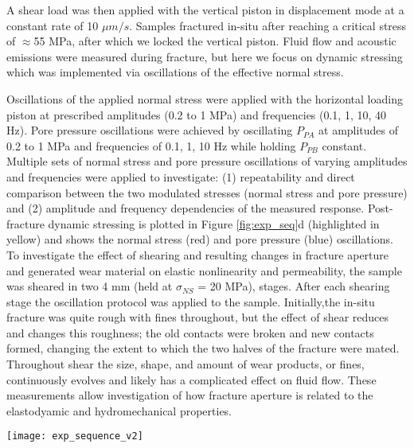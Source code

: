 \documentclass[draft]{agujournal2019}
\begin{document}
A shear load was then applied with the vertical piston in displacement mode at a constant rate of 10 $\mu m/s$. Samples fractured in-situ after reaching a critical stress of $ \approx $55 MPa, after which we locked the vertical piston. Fluid flow and acoustic emissions were measured during fracture, but here we focus on dynamic stressing which was implemented via oscillations of the effective normal stress.

Oscillations of the applied normal stress were applied with the horizontal loading piston at prescribed amplitudes (0.2 to 1 MPa) and frequencies (0.1, 1, 10, 40 Hz). Pore pressure oscillations were achieved by oscillating $P_{PA}$ at amplitudes of 0.2 to 1 MPa and frequencies of 0.1, 1, 10 Hz while holding  $P_{PB} $ constant. Multiple sets of normal stress and pore pressure oscillations of varying amplitudes and frequencies were applied to investigate: (1) repeatability and direct comparison between the two modulated stresses (normal stress and pore pressure) and (2) amplitude and frequency dependencies of the measured response. Post-fracture dynamic stressing is plotted in Figure \ref{fig:exp_seq}d (highlighted in yellow) and shows the normal stress (red) and pore pressure (blue) oscillations.
To investigate the effect of shearing and resulting changes in fracture aperture and generated wear material on elastic nonlinearity and permeability, the sample was sheared in two 4 mm (held at $ \sigma_{NS} $ = 20 MPa), stages. After each shearing stage the oscillation protocol was applied to the sample. Initially,the in-situ fracture was quite rough with fines throughout, but the effect of shear reduces and changes this roughness; the old contacts were broken and new contacts formed, changing the extent to which the two halves of the fracture were mated. Throughout shear the size, shape, and amount of wear products, or fines, continuously evolves and likely has a complicated effect on fluid flow. These measurements allow investigation of how fracture aperture is related to the elastodyamic and hydromechanical properties.

\begin{figure*}[ht]
	\centering
	\texttt{[image: exp\_sequence\_v2]}
	\caption[]{(a) Sketch showing sample dimensions and approximate PZT transmitter - receiver ray paths.
		(b) Fluid flow and pore pressure with inlet ($P_{PA}$ = 4 MPa) and outlet ($P_{PB}$ = 2 MPa).
		(c) Shear stress on the fracture plane was increased by advancing the long end of the L-shaped sample at a constant rate of 10 $\mu m/s$ while holding the short end in place. Fracture occurred in two stages at $ \approx $55 MPa.
		(d) Sketch showing the oscillation protocol applied to the freshly fractured sample. Multiple sets of $P_{P}$ and $ \sigma_{NS} $ oscillations of varying amplitude (up to about $ \pm $ 1 MPa) and frequency (0.1, 1, 10 and 40 Hz) were applied.
		(e) Fractures were sheared in two stages, each followed by the dynamic stressing protocol.}
	\label{fig:exp_seq}
\end{figure*}
\end{document}

